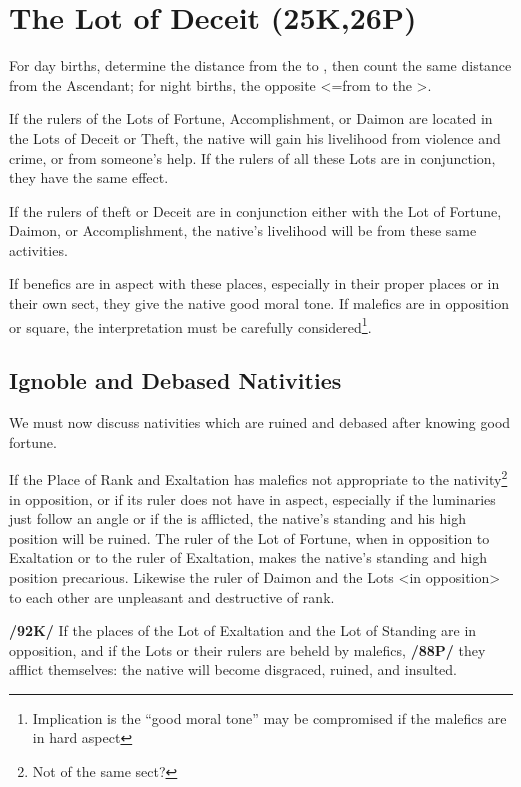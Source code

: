 \section{The Lot of Deceit (25K,26P)}

For day births, determine the distance from the \Sun\xspace to \Mars, then count the same distance from the Ascendant; for night births, the opposite <=from \Mars\xspace to the \Sun>. 

If the rulers of the Lots of Fortune, Accomplishment, or Daimon are located in the Lots of Deceit or Theft, the native will gain his livelihood from violence and crime, or from someone’s help. If the rulers of all these Lots are in conjunction, they
have the same effect. 

If the rulers of theft or Deceit are in conjunction either with the Lot of Fortune, Daimon, or Accomplishment, the native’s livelihood will be from these same activities. 

If benefics are in aspect with these places, especially in their proper places or in their own sect, they give the native good moral tone. \mndl If malefics are in opposition or square, the interpretation must be carefully considered\footnote{Implication is the ``good moral tone'' may be compromised if the malefics are in hard aspect}.

\subsection{\textlangle Ignoble and Debased Nativities\textrangle}
We must now discuss nativities which are ruined and debased after knowing good fortune. 

If the Place of Rank and Exaltation has malefics not appropriate to the nativity\footnote{Not of the same sect?} in opposition, or if its ruler does not have \Jupiter\xspace in aspect, especially if the luminaries just follow an angle or if the \Moon\xspace is afflicted, the native’s standing and his high position will be ruined. The ruler of the Lot of Fortune, when in opposition to Exaltation or to the ruler of Exaltation, makes the native’s standing and high position precarious. Likewise the ruler of Daimon and the Lots <in opposition> to each other are unpleasant and destructive of rank.

\textbf{/92K/} If the places of the Lot of Exaltation and the Lot of Standing are in opposition, and if the Lots or
their rulers are beheld by malefics, \textbf{/88P/} they afflict themselves: the native will become disgraced, ruined, and insulted. 

